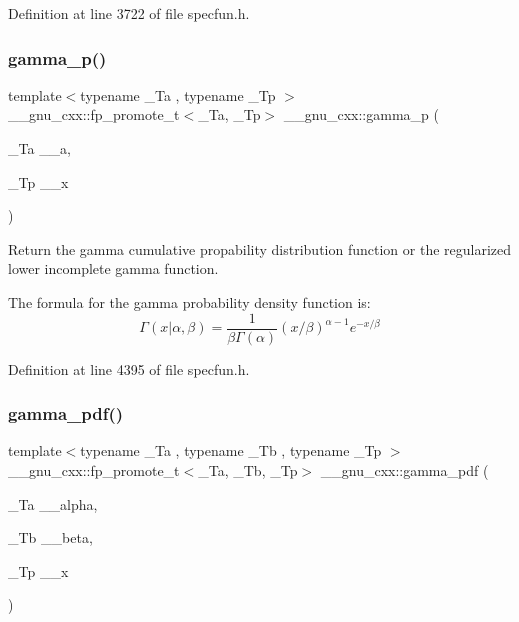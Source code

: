 Definition at line 3722 of file specfun.\+h.

\mbox{\label{group__gnu__math__spec__func_ga692601fa7508c0b97bf549e6362a49b9}} 
\subsubsection{\texorpdfstring{gamma\+\_\+p()}{gamma\_p()}}
{\footnotesize\ttfamily template$<$typename \+\_\+\+Ta , typename \+\_\+\+Tp $>$ \\
\+\_\+\+\_\+gnu\+\_\+cxx\+::fp\+\_\+promote\+\_\+t$<$\+\_\+\+Ta, \+\_\+\+Tp$>$ \+\_\+\+\_\+gnu\+\_\+cxx\+::gamma\+\_\+p (\begin{DoxyParamCaption}\item[{\+\_\+\+Ta}]{\+\_\+\+\_\+a,  }\item[{\+\_\+\+Tp}]{\+\_\+\+\_\+x }\end{DoxyParamCaption})\hspace{0.3cm}{\ttfamily [inline]}}



Return the gamma cumulative propability distribution function or the regularized lower incomplete gamma function. 

The formula for the gamma probability density function is\+: \[ \Gamma(x|\alpha,\beta) = \frac{1}{\beta\Gamma(\alpha)} (x/\beta)^{\alpha - 1} e^{-x/\beta} \] 

Definition at line 4395 of file specfun.\+h.

\mbox{\label{group__gnu__math__spec__func_ga55f530c37387a6c10c601c5838f3be00}} 
\subsubsection{\texorpdfstring{gamma\+\_\+pdf()}{gamma\_pdf()}}
{\footnotesize\ttfamily template$<$typename \+\_\+\+Ta , typename \+\_\+\+Tb , typename \+\_\+\+Tp $>$ \\
\+\_\+\+\_\+gnu\+\_\+cxx\+::fp\+\_\+promote\+\_\+t$<$\+\_\+\+Ta, \+\_\+\+Tb, \+\_\+\+Tp$>$ \+\_\+\+\_\+gnu\+\_\+cxx\+::gamma\+\_\+pdf (\begin{DoxyParamCaption}\item[{\+\_\+\+Ta}]{\+\_\+\+\_\+alpha,  }\item[{\+\_\+\+Tb}]{\+\_\+\+\_\+beta,  }\item[{\+\_\+\+Tp}]{\+\_\+\+\_\+x }\end{DoxyParamCaption})\hspace{0.3cm}{\ttfamily [inline]}}



